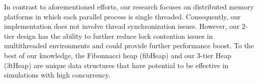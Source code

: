 In contrast to aforementioned efforts, our research focuses on distributed memory platforms in which each parallel process is single threaded. Consequently, our implementation does not involve thread synchronization issues. However, our 2-tier design has the ability to further reduce lock contention issues in multithreaded environments and could provide further performance boost. To the best of our knowledge, the Fibonnacci heap (fibHeap) and our 3-tier Heap (3tHeap) are unique data structures that have potential to be effective in simulations with high concurrency.